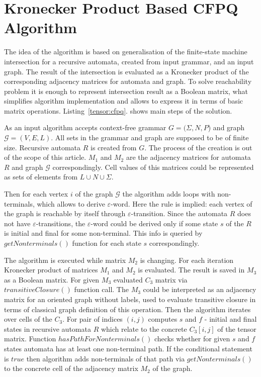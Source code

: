 \section{Kronecker Product Based CFPQ Algorithm}

The idea of the algorithm is based on generalisation of the finite-state machine intersection for a recursive automata, created from input grammar, and an input graph. The result of the intersection is evaluated as a Kronecker product of the corresponding adjacency matrices for automata and graph. To solve reachability problem it is enough to represent intersection result as a Boolean matrix, what simplifies algorithm implementation and allows to express it in terms of basic matrix operations. Listing~\ref{tensor:cfpq}. shows main steps of the solution.

As an input algorithm accepts context-free grammar $G=(\Sigma,N,P$) and graph $\mathcal{G}=(V,E,L)$. All sets in the grammar and graph are supposed to be of finite size. Recursive automata $R$ is created from $G$. The process of the creation is out of the scope of this article. $M_1$ and $M_2$ are the adjacency matrices for automata $R$ and graph $\mathcal{G}$ correspondingly. Cell values of this matrices could be represented as sets of elements from $L \cup N \cup \Sigma$.

Then for each vertex $i$ of the graph $\mathcal{G}$ the algorithm adds loops with non-terminals, which allows to derive $\varepsilon$-word. Here the rule is implied: each vertex of the graph is reachable by itself through $\varepsilon$-transition.  Since the automata $R$ does not have $\varepsilon$-transitions, the $\varepsilon$-word could be derived only if some state $s$ of the $R$ is initial and final for some non-terminal. This info is queried by $getNonterminals()$ function for each state $s$ correspondingly. 

The algorithm is executed while matrix $M_2$ is changing. For each iteration Kronecker product of matrices $M_1$ and $M_2$ is evaluated. The result is saved in $M_3$ as a Boolean matrix. For given $M_3$ evaluated $C_3$ matrix via $transitiveClosure()$ function call. The $M_3$ could be interpreted as an adjacency matrix for an oriented graph without labels, used to evaluate transitive closure in terms of classical graph definition of this operation. Then the algorithm iterates over cells of the $C_3$. For pair of indices $(i,j)$ computes $s$ and $f$ - initial and final states in recursive automata $R$ which relate to the concrete $C_3[i,j]$ of the tensor matrix. Function $hasPathForNonterminals()$ checks whether for given $s$ and $f$ states automata has at least one non-terminal path. If the conditional statement is $true$ then algorithm adds non-terminals of that path via $getNonterminals()$ to the concrete cell of the adjacency matrix $M_2$ of the graph.

